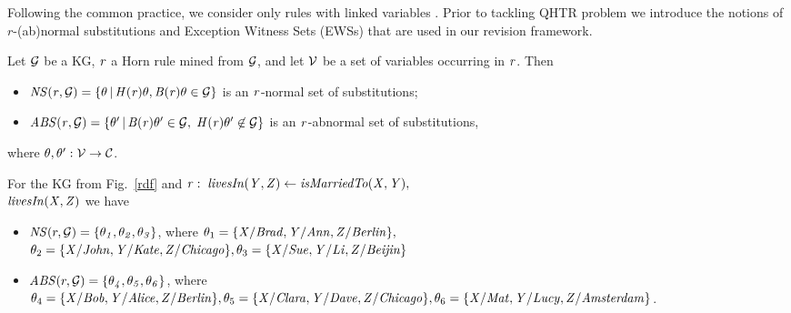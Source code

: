 


Following the common practice, we consider only rules with  linked variables \cite{DBLP:conf/kr/Helft89}.
Prior to tackling QHTR problem we introduce the notions of $r$-(ab)normal substitutions and Exception Witness Sets (EWSs) that are used in our revision framework.


\begin{definition}\label{sec:rulelearn}
Let $\mathcal{G}$ be a KG, $\mathit{r}$ a Horn rule mined from $\mathcal{G}$, and let $\mathcal{V}$ be a set of variables occurring in $\mathit{r}$. Then
\begin{itemize}
\item $\mathit{NS(r, \mathcal{G})=\{\theta\, |\, H(r)\theta,B(r)\theta \in \mathcal{G}\}}$ is an $\mathit{r}$-normal set of substitutions;
\item $\mathit{ABS(r, \mathcal{G})=\{\theta'\, |\, B(r)\theta' \in \mathcal{G},\;H(r)\theta' \not \in \mathcal{G}\}}$ is an $\mathit{r}$-abnormal set of substitutions,
\end{itemize} 
where $\theta,\theta':\mathcal{V} \rightarrow \mathcal{C}$.
\end{definition}

\begin{example}\label{ex:abns}
For the KG from Fig.~\ref{rdf} and $\mathit{r:\;livesIn(Y,Z)}\leftarrow \mathit{isMarriedTo(X,Y), }$\\$\mathit{livesIn(X,Z)}$ we have
\begin{itemize}
\item $\mathit{NS}(r,\mathcal{G})=\{\mathit{\theta_1,\theta_2,\theta_3}\}$, where $\theta_1=\{\mathit{X/Brad,Y/Ann,Z/Berlin}\},$\\$\theta_2=\{\mathit{X/John, Y/Kate, Z/Chicago}\},\theta_3=\{\mathit{X/Sue,Y/Li,Z/Beijin}\}$
\item $\mathit{ABS}(r,\mathcal{G})=\{\mathit{\theta_4,\theta_5,\theta_6}\}$, where $\theta_4=\{\mathit{X/Bob, Y/Alice, Z/Berlin}\}, \theta_5=\{\mathit{X/Clara, Y/Dave,Z/Chicago}\}, \theta_6=\{\mathit{X/Mat,Y/Lucy,Z/Amsterdam}\}$. 
\end{itemize}
\end{example}
 
